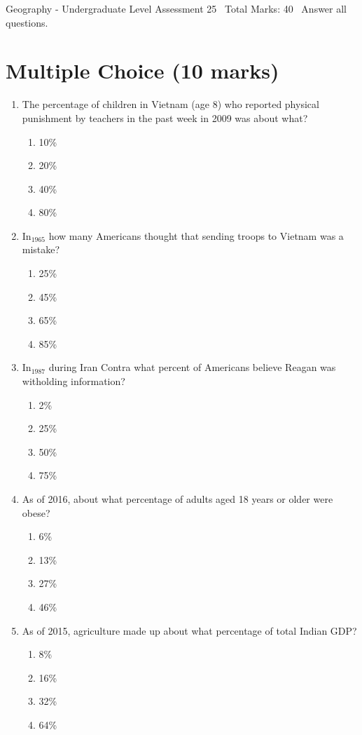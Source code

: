\documentclass[12pt]{article}
\begin{document}
\begin{center}
Geography - Undergraduate Level Assessment 25 \
Total Marks: 40 \
Answer all questions.
\end{center}

\section*{Multiple Choice (10 marks)}
\begin{enumerate}[label=\arabic*.]
\item The percentage of children in Vietnam (age 8) who reported physical punishment by teachers in the past week in 2009 was about what?
\begin{enumerate}[label=(\alph*)]
    \item 10\%
    \item 20\%
    \item 40\%
    \item 80\%
\end{enumerate}
\item In$_{1965}$ how many Americans thought that sending troops to Vietnam was a mistake?
\begin{enumerate}[label=(\alph*)]
    \item 25\%
    \item 45\%
    \item 65\%
    \item 85\%
\end{enumerate}
\item In$_{1987}$ during Iran Contra what percent of Americans believe Reagan was witholding information?
\begin{enumerate}[label=(\alph*)]
    \item 2\%
    \item 25\%
    \item 50\%
    \item 75\%
\end{enumerate}
\item As of 2016, about what percentage of adults aged 18 years or older were obese?
\begin{enumerate}[label=(\alph*)]
    \item 6\%
    \item 13\%
    \item 27\%
    \item 46\%
\end{enumerate}
\item As of 2015, agriculture made up about what percentage of total Indian GDP?
\begin{enumerate}[label=(\alph*)]
    \item 8\%
    \item 16\%
    \item 32\%
    \item 64\%
\end{enumerate}
\end{enumerate}
\end{document}
